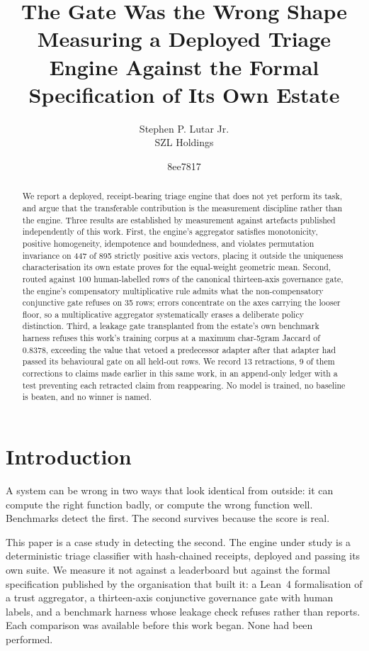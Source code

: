 \documentclass[11pt]{article}
\title{\textbf{The Gate Was the Wrong Shape}\\[2pt]
\large Measuring a Deployed Triage Engine Against the Formal Specification of Its Own Estate}
\author{Stephen P. Lutar Jr.\\ SZL Holdings}
\date{8ee7817}
\begin{document}
\maketitle

\begin{abstract}
\noindent
We report a deployed, receipt-bearing triage engine that does not yet perform its task, and argue that
the transferable contribution is the measurement discipline rather than the engine. Three results are
established by measurement against artefacts published independently of this work. First, the engine's
aggregator satisfies monotonicity, positive homogeneity, idempotence and boundedness, and violates
permutation invariance on 447 of 895 strictly positive axis vectors, placing
it outside the uniqueness characterisation its own estate proves for the equal-weight geometric mean.
Second, routed against 100 human-labelled rows of the canonical thirteen-axis governance
gate, the engine's compensatory multiplicative rule admits what the non-compensatory conjunctive gate
refuses on 35 rows; errors concentrate on the axes carrying the looser floor, so a
multiplicative aggregator systematically erases a deliberate policy distinction. Third, a leakage gate
transplanted from the estate's own benchmark harness refuses this work's training corpus at a maximum
char-5gram Jaccard of 0.8378, exceeding the value that vetoed a
predecessor adapter after that adapter had passed its behavioural gate on all held-out rows. We record
13 retractions, 9 of them corrections to claims made earlier in this
same work, in an append-only ledger with a test preventing each retracted claim from reappearing. No
model is trained, no baseline is beaten, and no winner is named.
\end{abstract}

\section{Introduction}
A system can be wrong in two ways that look identical from outside: it can compute the right function
badly, or compute the wrong function well. Benchmarks detect the first. The second survives because the
score is real.

This paper is a case study in detecting the second. The engine under study is a deterministic triage
classifier with hash-chained receipts, deployed and passing its own suite. We measure it not against a
leaderboard but against the formal specification published by the organisation that built it: a Lean~4
formalisation of a trust aggregator, a thirteen-axis conjunctive governance gate with human labels, and
a benchmark harness whose leakage check refuses rather than reports. Each comparison was available before
this work began. None had been performed.
\end{document}
